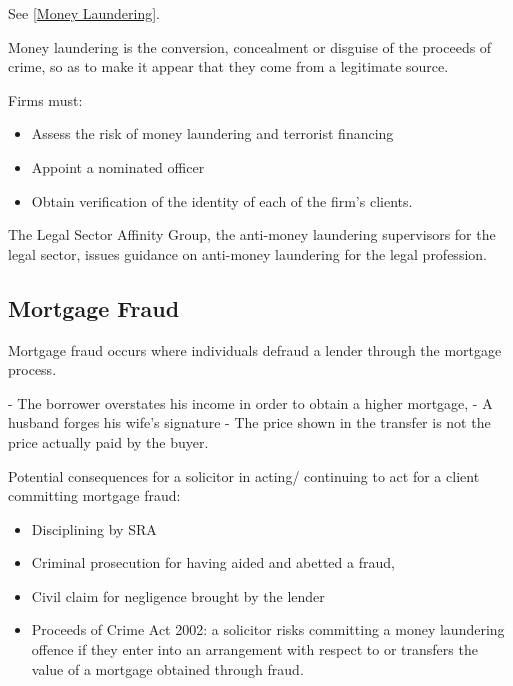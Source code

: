 \documentclass[
]{article}
\newenvironment{Shaded}{}{}
\newcommand{\NormalTok}[1]{#1}
\providecommand{\tightlist}{%
  \setlength{\itemsep}{0pt}\setlength{\parskip}{0pt}}
\begin{document}
See {[}\protect\hyperlink{money-laundering}{Money Laundering}{]}.

\begin{Shaded}
\begin{Highlighting}[]
\NormalTok{Money laundering is the conversion, concealment or disguise of the}
\NormalTok{proceeds of crime, so as to make it appear that they come from a legitimate source.}
\end{Highlighting}
\end{Shaded}

Firms must:

\begin{itemize}
\tightlist
\item
  Assess the risk of money laundering and terrorist financing
\item
  Appoint a nominated officer
\item
  Obtain verification of the identity of each of the firm's clients.
\end{itemize}

\begin{Shaded}
\begin{Highlighting}[]
\NormalTok{The Legal Sector Affinity Group, the anti{-}money laundering supervisors for the legal sector, issues guidance on anti{-}money laundering for the legal profession.}
\end{Highlighting}
\end{Shaded}

\hypertarget{mortgage-fraud}{%
\subsection{Mortgage Fraud}\label{mortgage-fraud}}

Mortgage fraud occurs where individuals defraud a lender through the
mortgage process.

\begin{Shaded}
\begin{Highlighting}[]
\NormalTok{{-} The borrower overstates his income in order to obtain a higher mortgage,}
\NormalTok{{-} A husband forges his wife’s signature}
\NormalTok{{-} The price shown in the transfer is not the price actually paid by the buyer.}
\end{Highlighting}
\end{Shaded}

Potential consequences for a solicitor in acting/ continuing to act for
a client committing mortgage fraud:

\begin{itemize}
\tightlist
\item
  Disciplining by SRA
\item
  Criminal prosecution for having aided and abetted a fraud,
\item
  Civil claim for negligence brought by the lender
\item
  Proceeds of Crime Act 2002: a solicitor risks committing a money
  laundering offence if they enter into an arrangement with respect to
  or transfers the value of a mortgage obtained through fraud.
\end{itemize}
\end{document}
